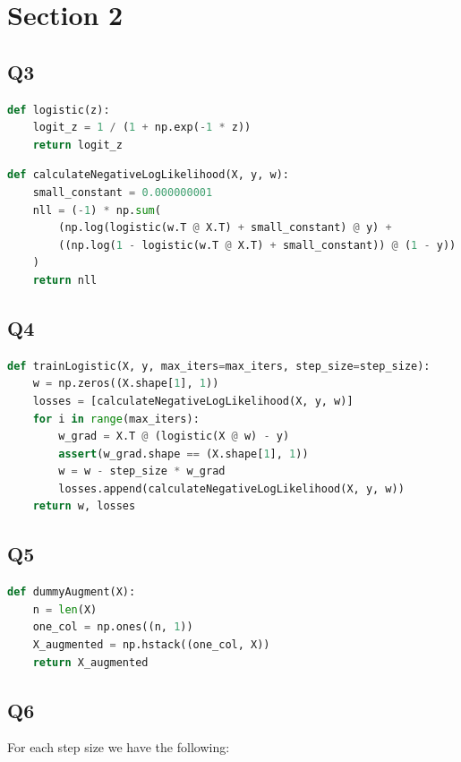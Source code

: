 \documentclass{article}
\theoremstyle{definition}
\begin{document}
\section*{Section 2}
    \subsection*{Q3}
\begin{lstlisting}[language=python]
def logistic(z):
    logit_z = 1 / (1 + np.exp(-1 * z))
    return logit_z
\end{lstlisting}
\begin{lstlisting}[language=python]
def calculateNegativeLogLikelihood(X, y, w):
    small_constant = 0.000000001
    nll = (-1) * np.sum(
        (np.log(logistic(w.T @ X.T) + small_constant) @ y) + 
        ((np.log(1 - logistic(w.T @ X.T) + small_constant)) @ (1 - y))
    )
    return nll
    \end{lstlisting}
    \subsection*{Q4}
\begin{lstlisting}[language=python]
def trainLogistic(X, y, max_iters=max_iters, step_size=step_size):
    w = np.zeros((X.shape[1], 1))
    losses = [calculateNegativeLogLikelihood(X, y, w)]
    for i in range(max_iters):
        w_grad = X.T @ (logistic(X @ w) - y)
        assert(w_grad.shape == (X.shape[1], 1))
        w = w - step_size * w_grad
        losses.append(calculateNegativeLogLikelihood(X, y, w))
    return w, losses
\end{lstlisting}
    \subsection*{Q5}
    \begin{lstlisting}[language=python]
def dummyAugment(X):
    n = len(X)
    one_col = np.ones((n, 1))
    X_augmented = np.hstack((one_col, X))
    return X_augmented
    \end{lstlisting}
    \subsection*{Q6}
For each step size we have the following:\\\\
\end{document}
